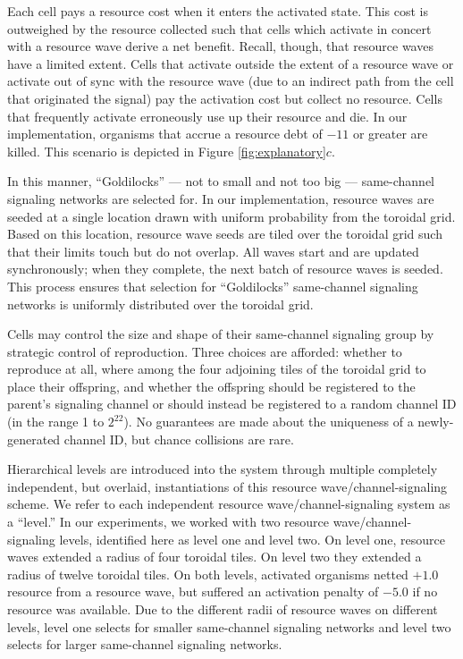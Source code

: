 Each cell pays a resource cost when it enters the activated state.
This cost is outweighed by the resource collected such that cells which activate in concert with a resource wave derive a net benefit.
Recall, though, that resource waves have a limited extent.
Cells that activate outside the extent of a resource wave or activate out of sync with the resource wave (due to an indirect path from the cell that originated the signal) pay the activation cost but collect no resource.
Cells that frequently activate erroneously use up their resource and die.
In our implementation, organisms that accrue a resource debt of $-11$ or greater are killed.
This scenario is depicted in Figure \ref{fig:explanatory}$c$.

In this manner, ``Goldilocks'' --- not to small and not too big --- same-channel signaling networks are selected for.
In our implementation, resource waves are seeded at a single location drawn  with uniform probability from the toroidal grid.
Based on this location, resource wave seeds are tiled over the toroidal grid such that their limits touch but do not overlap.
All waves start and are updated synchronously;
when they complete, the next batch of resource waves is seeded.
This process ensures that selection for ``Goldilocks'' same-channel signaling networks is uniformly distributed over the toroidal grid.

Cells may control the size and shape of their same-channel signaling group by strategic control of reproduction.
Three choices are afforded: whether to reproduce at all, where among the four adjoining tiles of the toroidal grid to place their offspring, and whether the offspring should be registered to the parent's signaling channel or should instead be registered to a random channel ID (in the range 1 to $2^{22}$).
No guarantees are made about the uniqueness of a newly-generated channel ID, but chance collisions are rare.

Hierarchical levels are introduced into the system through multiple completely independent, but overlaid, instantiations of this resource wave/channel-signaling scheme.
We refer to each independent resource wave/channel-signaling system as a ``level.''
In our experiments, we worked with two resource wave/channel-signaling levels, identified here as level one and level two.
On level one, resource waves extended a radius of four toroidal tiles.
On level two they extended a radius of twelve toroidal tiles.
On both levels, activated organisms netted $+1.0$ resource from a resource wave, but suffered an activation penalty of $-5.0$ if no resource was available.
Due to the different radii of resource waves on different levels, level one selects for smaller same-channel signaling networks and level two selects for larger same-channel signaling networks.


